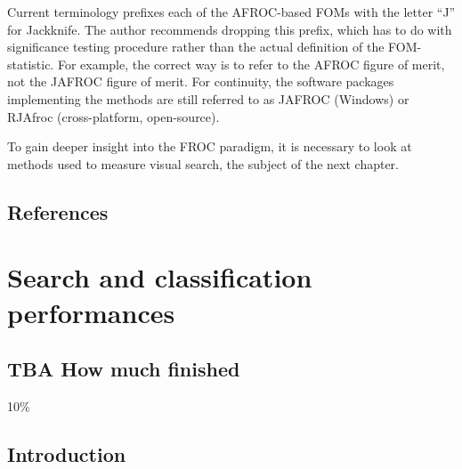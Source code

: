 \documentclass[
]{book}
\begin{document}
Current terminology prefixes each of the AFROC-based FOMs with the letter ``J'' for Jackknife. The author recommends dropping this prefix, which has to do with significance testing procedure rather than the actual definition of the FOM-statistic. For example, the correct way is to refer to the AFROC figure of merit, not the JAFROC figure of merit. For continuity, the software packages implementing the methods are still referred to as JAFROC (Windows) or RJAfroc (cross-platform, open-source).

To gain deeper insight into the FROC paradigm, it is necessary to look at methods used to measure visual search, the subject of the next chapter.

\hypertarget{froc-meanings-references}{%
\section{References}\label{froc-meanings-references}}

\hypertarget{rsm-sc}{%
\chapter{Search and classification performances}\label{rsm-sc}}

\hypertarget{rsm-sc-how-much-finished}{%
\section{TBA How much finished}\label{rsm-sc-how-much-finished}}

10\%

\hypertarget{rsm-sc-intro}{%
\section{Introduction}\label{rsm-sc-intro}}
\end{document}
